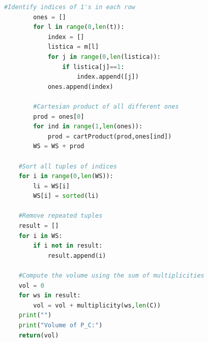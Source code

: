 \documentclass[english,11pt]{article}
\theoremstyle{definition}
\theoremstyle{definition}
\theoremstyle{definition}
\theoremstyle{remark}
\theoremstyle{definition}
\begin{document}
\begin{lstlisting}[language=Python]
        #Identify indices of 1's in each row
        ones = []
        for l in range(0,len(t)):
            index = []
            listica = m[l]
            for j in range(0,len(listica)):
                if listica[j]==1:
                    index.append([j])
            ones.append(index)

        #Cartesian product of all different ones    
        prod = ones[0]
        for ind in range(1,len(ones)):
            prod = cartProduct(prod,ones[ind])
        WS = WS + prod

    #Sort all tuples of indices
    for i in range(0,len(WS)):
        li = WS[i]
        WS[i] = sorted(li)

    #Remove repeated tuples
    result = []
    for i in WS:
        if i not in result:
            result.append(i)

    #Compute the volume using the sum of multiplicities
    vol = 0
    for ws in result:
        vol = vol + multiplicity(ws,len(C))
    print("")
    print("Volume of P_C:")
    return(vol)
\end{lstlisting}
\end{document}
